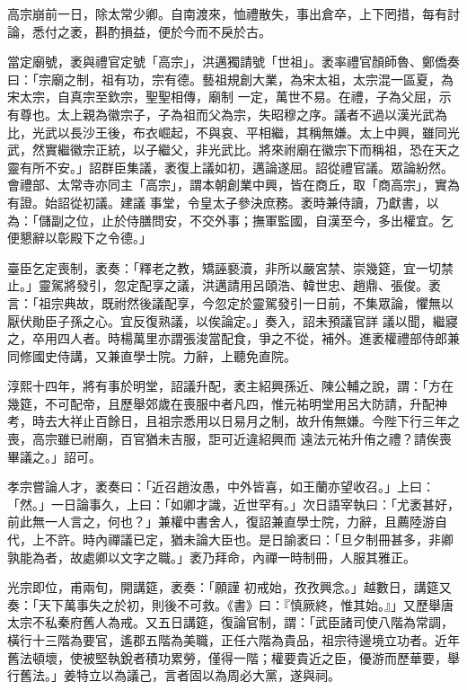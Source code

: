 \begin{pinyinscope}
 高宗崩前一日，除太常少卿。自南渡來，恤禮散失，事出倉卒，上下罔措，每有討論，悉付之袤，斟酌損益，便於今而不戾於古。



 當定廟號，袤與禮官定號「高宗」，洪邁獨請號「世祖」。袤率禮官顏師魯、鄭僑奏曰：「宗廟之制，祖有功，宗有德。藝祖規創大業，為宋太祖，太宗混一區夏，為宋太宗，自真宗至欽宗，聖聖相傳，廟制
 一定，萬世不易。在禮，子為父屈，示有尊也。太上親為徽宗子，子為祖而父為宗，失昭穆之序。議者不過以漢光武為比，光武以長沙王後，布衣崛起，不與哀、平相繼，其稱無嫌。太上中興，雖同光武，然實繼徽宗正統，以子繼父，非光武比。將來祔廟在徽宗下而稱祖，恐在天之靈有所不安。」詔群臣集議，袤復上議如初，邁論遂屈。詔從禮官議。眾論紛然。會禮部、太常寺亦同主「高宗」，謂本朝創業中興，皆在商丘，取「商高宗」，實為有證。始詔從初議。建議
 事堂，令皇太子參決庶務。袤時兼侍讀，乃獻書，以為：「儲副之位，止於侍膳問安，不交外事；撫軍監國，自漢至今，多出權宜。乞便懇辭以彰殿下之令德。」



 臺臣乞定喪制，袤奏：「釋老之教，矯誣褻瀆，非所以嚴宮禁、崇幾筵，宜一切禁止。」靈駕將發引，忽定配享之議，洪邁請用呂頤浩、韓世忠、趙鼎、張俊。袤言：「祖宗典故，既祔然後議配享，今忽定於靈駕發引一日前，不集眾論，懼無以厭伏勛臣子孫之心。宜反復熟議，以俟論定。」奏入，詔未預議官詳
 議以聞，繼寢之，卒用四人者。時楊萬里亦謂張浚當配食，爭之不從，補外。進袤權禮部侍郎兼同修國史侍講，又兼直學士院。力辭，上聽免直院。



 淳熙十四年，將有事於明堂，詔議升配，袤主紹興孫近、陳公輔之說，謂：「方在幾筵，不可配帝，且歷舉郊歲在喪服中者凡四，惟元祐明堂用呂大防請，升配神考，時去大祥止百餘日，且祖宗悉用以日易月之制，故升侑無嫌。今陛下行三年之喪，高宗雖已祔廟，百官猶未吉服，詎可近違紹興而
 遠法元祐升侑之禮？請俟喪畢議之。」詔可。



 孝宗嘗論人才，袤奏曰：「近召趙汝愚，中外皆喜，如王蘭亦望收召。」上曰：「然。」一日論事久，上曰：「如卿才識，近世罕有。」次日語宰執曰：「尤袤甚好，前此無一人言之，何也？」兼權中書舍人，復詔兼直學士院，力辭，且薦陸游自代，上不許。時內禪議已定，猶未論大臣也。是日諭袤曰：「旦夕制冊甚多，非卿孰能為者，故處卿以文字之職。」袤乃拜命，內禪一時制冊，人服其雅正。



 光宗即位，甫兩旬，開講筵，袤奏：「願謹
 初戒始，孜孜興念。」越數日，講筵又奏：「天下萬事失之於初，則後不可救。《書》曰：『慎厥終，惟其始。』」又歷舉唐太宗不私秦府舊人為戒。又五日講筵，復論官制，謂：「武臣諸司使八階為常調，橫行十三階為要官，遙郡五階為美職，正任六階為貴品，祖宗待邊境立功者。近年舊法頓壞，使被堅執銳者積功累勞，僅得一階；權要貴近之臣，優游而歷華要，舉行舊法。」姜特立以為議己，言者固以為周必大黨，遂與祠。




\end{pinyinscope}
